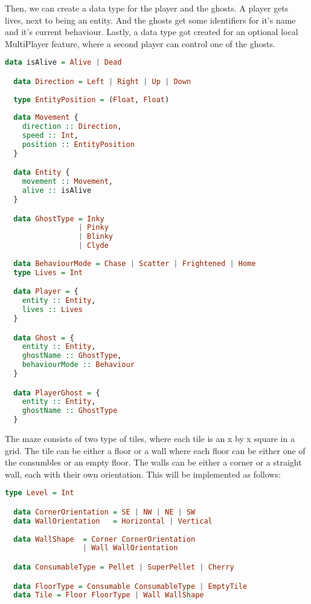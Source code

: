 \documentclass[11pt]{Article}
\begin{document}
Then, we can create a data type for the player and the ghosts. A player gets lives, next to being an entity. And the ghosts get some identifiers for it's name and it's current behaviour. Lastly, a data type got created for an optional local MultiPlayer feature, where a second player can control one of the ghosts.

\begin{lstlisting}[language=Haskell]
  data isAlive = Alive | Dead

  data Direction = Left | Right | Up | Down
  
  type EntityPosition = (Float, Float)
  
  data Movement {
    direction :: Direction,
    speed :: Int,
    position :: EntityPosition
  }

  data Entity {
    movement :: Movement,
    alive :: isAlive
  }

  data GhostType = Inky 
                 | Pinky 
                 | Blinky 
                 | Clyde 
  
  data BehaviourMode = Chase | Scatter | Frightened | Home
  type Lives = Int

  data Player = {
    entity :: Entity,
    lives :: Lives
  }

  data Ghost = {
    entity :: Entity,
    ghostName :: GhostType,
    behaviourMode :: Behaviour
  }

  data PlayerGhost = {
    entity :: Entity,
    ghostName :: GhostType
  }
\end{lstlisting}

\noindent The maze consists of two type of tiles, where each tile is an x by x square in a grid. The tile can be either a floor or a wall where each floor can be either one of the consumbles or an empty floor. The walls can be either a corner or a straight wall, each with their own orientation. This will be implemented as follows:
\begin{lstlisting}[language=Haskell]
  type Level = Int

  data CornerOrientation = SE | NW | NE | SW
  data WallOrientation   = Horizontal | Vertical
  
  data WallShape  = Corner CornerOrientation
                  | Wall WallOrientation 

  data ConsumableType = Pellet | SuperPellet | Cherry

  data FloorType = Consumable ConsumableType | EmptyTile
  data Tile = Floor FloorType | Wall WallShape
\end{lstlisting}
\end{document}
